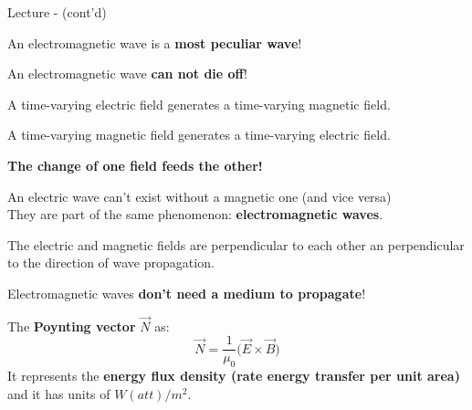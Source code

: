 \begin{frame}{Lecture \summarizedlecture - \lecturesummarytitle (cont'd)}

\begin{itemize}

\item
An electromagnetic wave is a {\bf most peculiar wave}!

   \begin{itemize}
   {\small
     \item An electromagnetic wave  {\bf can not die off}!
             \begin{itemize}
             {\scriptsize
               \item A time-varying electric field generates a time-varying magnetic field.
               \item A time-varying magnetic field generates a time-varying electric  field.
             }
             \end{itemize}
             {\bf The change of one field feeds the other!}

     \vspace{0.1cm}

     \item An electric wave can't exist without a magnetic one (and vice versa)\\
               They are part of the same phenomenon: {\bf electromagnetic waves}.

     \vspace{0.1cm}

     \item The electric and magnetic fields are perpendicular to each
               other an perpendicular to the direction of wave propagation.

     \vspace{0.1cm}

     \item Electromagnetic waves {\bf don't need a medium to propagate}!
   }
   \end{itemize}

\item
The {\bf Poynting vector} $\vec{N}$ as:
\begin{equation*}
  \vec{N} = \frac{1}{\mu_0} \Big( \vec{E} \times \vec{B} \Big)
\end{equation*}
It represents the {\bf energy flux density (rate energy transfer per unit area)} and it has units of $W(att)/m^2$.\\

\end{itemize}

\end{frame}


